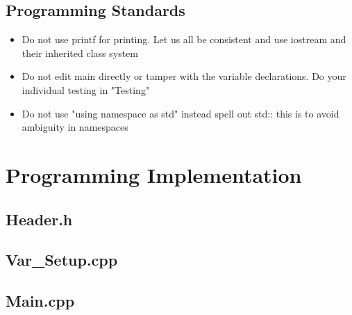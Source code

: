 \documentclass[a4paper, 12pt]{report}
\let\stdsection\section
\renewcommand\section{\newpage\stdsection}
\begin{document}
\begin{center}
\subsection{Programming Standards}
\begin{comment}
\end{comment}
\begin{itemize}
\item Do not use printf for printing. Let us all be consistent and use iostream and their inherited class system
\item Do not edit main directly or tamper with the variable declarations. Do your individual testing in "Testing"
\item Do not use "using namespace as std" instead spell out std:: this is to avoid ambiguity in namespaces
\end{itemize}

\section{Programming Implementation}
\begin{comment}
\end{comment}

\subsection{Header.h}
\begin{comment}
\end{comment}



\subsection{Var\_Setup.cpp}
\begin{comment}
\end{comment}



\subsection{Main.cpp}
\begin{comment}
\end{comment}




\end{center}
\end{document}
